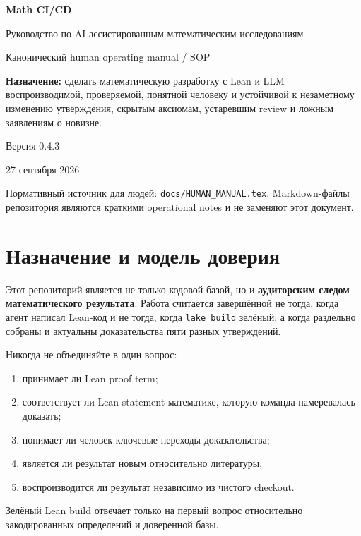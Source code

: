 \documentclass[11pt,a4paper]{article}
\newcommand{\cmd}[1]{\texttt{#1}}
\begin{document}
\begin{titlepage}
\centering
\vspace*{24mm}
{\Huge\bfseries\color{navy} Math CI/CD\par}
\vspace{5mm}
{\LARGE Руководство по AI-ассистированным математическим исследованиям\par}
\vspace{9mm}
{\large Канонический human operating manual / SOP\par}
\vfill
\begin{tcolorbox}[width=.82\textwidth,colback=lightblue,colframe=blue,arc=2pt]
\centering
\textbf{Назначение:} сделать математическую разработку с Lean и LLM воспроизводимой, проверяемой, понятной человеку и устойчивой к незаметному изменению утверждения, скрытым аксиомам, устаревшим review и ложным заявлениям о новизне.
\end{tcolorbox}
\vfill
{\large Версия 0.4.3\par}
{\normalsize 27 сентября 2026\par}
\vspace{8mm}
{\small Нормативный источник для людей: \texttt{docs/HUMAN\_MANUAL.tex}. Markdown-файлы репозитория являются краткими operational notes и не заменяют этот документ.\par}
\end{titlepage}

\tableofcontents
\clearpage

\section{Назначение и модель доверия}

Этот репозиторий является не только кодовой базой, но и \textbf{аудиторским следом математического результата}. Работа считается завершённой не тогда, когда агент написал Lean-код и не тогда, когда \cmd{lake build} зелёный, а когда раздельно собраны и актуальны доказательства пяти разных утверждений.

\begin{principle}
Никогда не объединяйте в один вопрос:
\begin{enumerate}
\item принимает ли Lean proof term;
\item соответствует ли Lean statement математике, которую команда намеревалась доказать;
\item понимает ли человек ключевые переходы доказательства;
\item является ли результат новым относительно литературы;
\item воспроизводится ли результат независимо из чистого checkout.
\end{enumerate}
Зелёный Lean build отвечает только на первый вопрос относительно закодированных определений и доверенной базы.
\end{principle}
\end{document}
